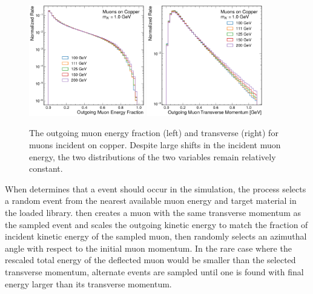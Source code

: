 \begin{figure}[!htbp]
    \centering
    \includegraphics[width=0.45\textwidth]{figures/muon_energy_comp_efrac.pdf}
    \hspace{0.01\textwidth}
    \includegraphics[width=0.45\textwidth]{figures/muon_energy_comp_pt.pdf}
    \caption[
        Sampling variables used for \dbrem simulation.
    ]{
        The outgoing muon energy fraction (left) and transverse (right) for muons incident on copper. Despite large shifts in the incident muon energy, the two distributions of the two variables remain relatively constant. 
    }
    \label{fig:efrac_pt}
\end{figure}

When \gf determines that a \dbrem event should occur in the simulation, the process selects a random event from the nearest available muon energy and target material in the loaded \mg library. 
\gf then creates a muon with the same transverse momentum as the sampled event and scales the outgoing kinetic energy to match the fraction of incident kinetic energy of the sampled muon, then randomly selects an azimuthal angle with respect to the initial muon momentum. 
In the rare case where the rescaled total energy of the deflected muon would be smaller than the selected transverse momentum, alternate events are sampled until one is found with final energy larger than its transverse momentum. 


